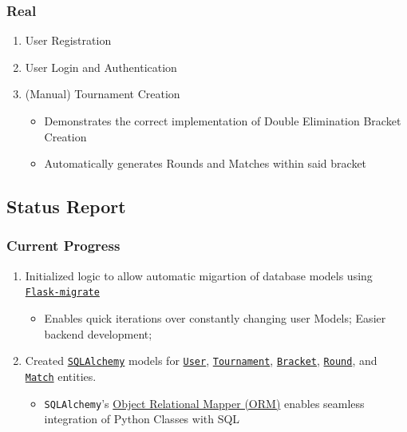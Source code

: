 \documentclass{article}
\begin{document}
\subsubsection*{Real}
\begin{enumerate}
    \item{User Registration}
    \item{User Login and Authentication}
    \item{(Manual) Tournament Creation
    \begin{itemize}
        \item{Demonstrates the correct implementation of Double Elimination Bracket Creation}
        \item{Automatically generates Rounds and Matches within said bracket}
        
    \end{itemize}
    }
    
\end{enumerate}
\subsection*{Status Report}
\subsubsection*{Current Progress}
\begin{enumerate}
    \item{Initialized logic to allow automatic migartion of database models using \href{https://flask-migrate.readthedocs.io/en/latest/}{\texttt{Flask-migrate}}
    \begin{itemize}
        \item{Enables quick iterations over constantly changing user Models; Easier backend development;}
        
    \end{itemize}
    
    }
    \item{Created \href{https://www.sqlalchemy.org/}{\texttt{SQLAlchemy}} models for 
    \href{https://github.com/alextrosta/brackit/blob/master/backend/app/models.py#L26}{\texttt{User}}, 
    \href{https://github.com/alextrosta/brackit/blob/master/backend/app/models.py#L79}{\texttt{Tournament}}, 
    \href{https://github.com/alextrosta/brackit/blob/master/backend/app/models.py#L91}{\texttt{Bracket}}, 
    \href{https://github.com/alextrosta/brackit/blob/master/backend/app/models.py#L106}{\texttt{Round}}, and 
    \href{https://github.com/alextrosta/brackit/blob/master/backend/app/models.py#L120}{\texttt{Match}} entities.
    \begin{itemize}
        \item{\texttt{SQLAlchemy}'s \href{https://docs.sqlalchemy.org/en/13/orm/}{Object Relational Mapper (ORM)} enables seamless integration of Python Classes with SQL}
    \end{itemize}
    }
    
\end{enumerate}
\end{document}
